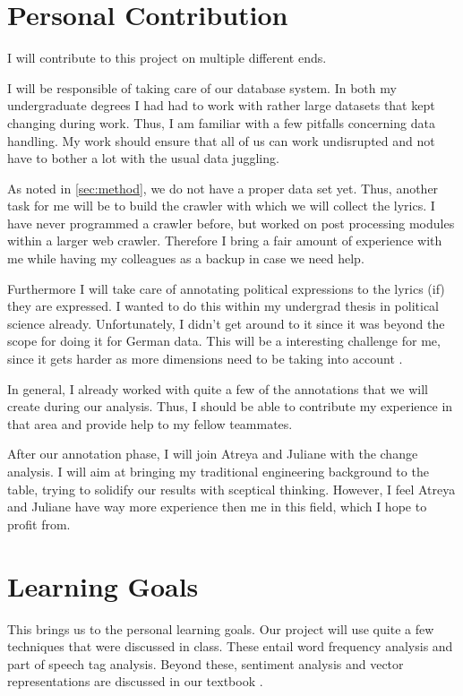 \documentclass[11pt,a4paper]{article}
\begin{document}
\thispagestyle{plain}
\section*{Personal Contribution}

I will contribute to this project on multiple different ends. 

I will be responsible of taking care of our database system. In both my undergraduate degrees I had had to work with rather large datasets that kept changing during work. Thus, I am familiar with a few pitfalls concerning data handling. My work should ensure that all of us can work undisrupted and not have to bother a lot with the usual data juggling. 

As noted in \cref{sec:method}, we do not have a proper data set yet. Thus, another task for me will be to build the crawler with which we will collect the lyrics. I have never programmed a crawler before, but worked on post processing modules within a larger web crawler. Therefore I bring a fair amount of experience with me while having my colleagues as a backup in case we need help.

Furthermore I will take care of annotating political expressions to the lyrics (if) they are expressed. I wanted to do this within my undergrad thesis in political science already. Unfortunately, I didn't get around to it since it was beyond the scope for doing it for German data. This will be a interesting challenge for me, since it gets harder as more dimensions need to be taking into account \cite{cohen_classifying_2013}. 

In general, I already worked with quite a few of the annotations that we will create during our analysis. Thus, I should be able to contribute my experience in that area and provide help to my fellow teammates. 

After our annotation phase, I will join Atreya and Juliane with the change analysis. I will aim at bringing my traditional engineering background to the table, trying to solidify our results with sceptical thinking. However, I feel Atreya and Juliane have way more experience then me in this field, which I hope to profit from.

\section*{Learning Goals}

This brings us to the personal learning goals.
Our project will use quite a few techniques that were discussed in class. These entail word frequency analysis and part of speech tag analysis. Beyond these, sentiment analysis and vector representations are discussed in our textbook \cite{jurafsky2014speech}. 
\end{document}
